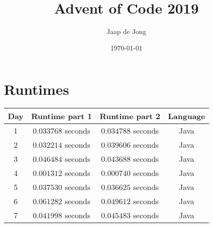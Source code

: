 \documentclass[]{report}
\title{Advent of Code 2019}
\author{Jaap de Jong}
\date{\today}
\begin{document}
	\maketitle
	\chapter{Runtimes}
	\begin{center}
		\begin{tabular}{|c|c|c|c|}
			\hline
			\textbf{Day} & \textbf{Runtime part 1} & \textbf{Runtime part 2} & \textbf{Language}\\
			\hline
			1 & $0.033768$ seconds & $0.034788$ seconds & Java \\
			2 & $0.032214$ seconds & $0.039606$ seconds & Java \\
			3 & $0.046484$ seconds & $0.043688$ seconds & Java \\
			4 & $0.001312$ seconds & $0.000740$ seconds & Java \\
			5 & $0.037530$ seconds & $0.036625$ seconds & Java \\
			6 & $0.061282$ seconds & $0.049612$ seconds & Java \\
			7 & $0.041998$ seconds & $0.045483$ seconds & Java \\
			\hline
		\end{tabular}
	\end{center}
\end{document}
